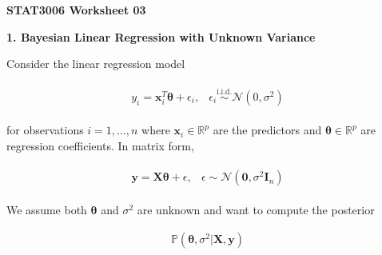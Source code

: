 \documentclass[11pt]{article}
\begin{document}
    \begin{center}
        \Large \textbf{STAT3006 Worksheet 03}
    \end{center}

    \large \textbf{1. Bayesian Linear Regression with Unknown Variance}

    Consider the linear regression model

    \begin{align*}
        \begin{matrix}
            y_i = \mathbf{x}_i^T \boldsymbol{\theta} + \epsilon_i,
            & \epsilon_i \stackrel{\text{i.i.d.}}{\sim} \mathcal{N}(0, \sigma^2)
        \end{matrix}
    \end{align*}

    for observations $i = 1, \dots, n$ where $\mathbf{x}_i \in \mathbb{R}^p$ are the predictors 
    and $\boldsymbol{\theta} \in \mathbb{R}^p$ are regression coefficients. In matrix form,

    \begin{align*}
        \begin{matrix}
            \mathbf{y} = \mathbf{X} \boldsymbol{\theta} + \epsilon ,
            & \epsilon \sim \mathcal{N}(\mathbf{0}, \sigma^2 \mathbf{I}_n)
        \end{matrix}
    \end{align*}

    We assume both $\boldsymbol{\theta}$ and $\sigma^2$ are unknown and want to compute the 
    posterior

    \begin{align*}
        \mathbb{P}(\boldsymbol{\theta}, \sigma^2 | \mathbf{X}, \mathbf{y})
    \end{align*}
\end{document}
